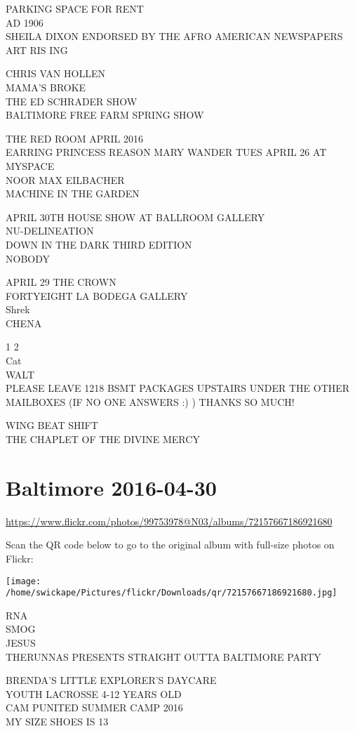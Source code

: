 \documentclass[10pt,letterpaper]{article}
\begin{document}
PARKING SPACE FOR RENT\\
AD 1906\\
SHEILA DIXON ENDORSED BY THE AFRO AMERICAN NEWSPAPERS\\
ART RIS ING

CHRIS VAN HOLLEN\\
MAMA'S BROKE\\
THE ED SCHRADER SHOW\\
BALTIMORE FREE FARM SPRING SHOW

THE RED ROOM APRIL 2016\\
EARRING PRINCESS REASON MARY WANDER TUES APRIL 26 AT MYSPACE\\
NOOR MAX EILBACHER\\
MACHINE IN THE GARDEN

APRIL 30TH HOUSE SHOW AT BALLROOM GALLERY\\
NU{-}DELINEATION\\
DOWN IN THE DARK THIRD EDITION\\
NOBODY

APRIL 29 THE CROWN\\
FORTYEIGHT LA BODEGA GALLERY\\
Shrek\\
CHENA

1 2\\
Cat\\
WALT\\
PLEASE LEAVE 1218 BSMT PACKAGES UPSTAIRS UNDER THE OTHER MAILBOXES (IF NO ONE ANSWERS :) )  THANKS SO MUCH!

WING BEAT SHIFT\\
THE CHAPLET OF THE DIVINE MERCY


\section*{Baltimore 2016-04-30}

\url{https://www.flickr.com/photos/99753978@N03/albums/72157667186921680}

Scan the QR code below to go to the original album with full-size photos on Flickr:

\texttt{[image: /home/swickape/Pictures/flickr/Downloads/qr/72157667186921680.jpg]}


RNA\\
SMOG\\
JESUS\\
THERUNNAS PRESENTS STRAIGHT OUTTA BALTIMORE PARTY

BRENDA'S LITTLE EXPLORER'S DAYCARE\\
YOUTH LACROSSE 4{-}12 YEARS OLD\\
CAM PUNITED SUMMER CAMP 2016\\
MY SIZE SHOES IS 13
\end{document}
